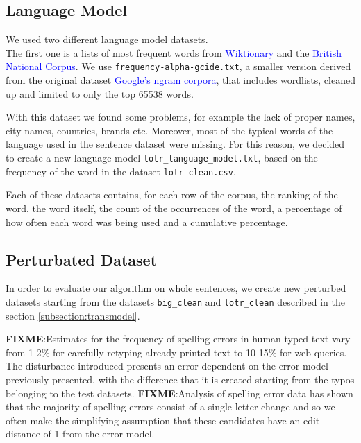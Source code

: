 \subsection{Language Model}
We used two different language model datasets. \\
The first one is a lists of most frequent words from \href{https://en.wiktionary.org/wiki/Wiktionary:Frequency_lists}{ 
\textcolor{blue}{Wiktionary}} and the \href{http://www.kilgarriff.co.uk/bnc-readme.html}{\textcolor{blue}{British National 
Corpus}}. 
We use \texttt{frequency-alpha-gcide.txt}, a smaller version derived from the original dataset 
\href{https://books.google.com/ngrams/}{\textcolor{blue}{Google's ngram corpora}}, that includes wordlists, cleaned up 
and limited to only the top \num{65538} words.

With this dataset we found some problems, for example the lack of proper names, city names, countries, brands etc.
Moreover, most of the typical words of the language used in the sentence dataset were missing.
For this reason, we decided to create a new language model \texttt{lotr\_language\_model.txt}, based on the frequency of 
the word in the dataset \texttt{lotr\_clean.csv}.

Each of these datasets contains, for each row of the corpus, the ranking of the word, the word itself, the count of the 
occurrences of the word, a percentage of how often each word was being used and a cumulative percentage.

\subsection{Perturbated Dataset}
\label{subsection:perturbed}
In order to evaluate our algorithm on whole sentences, we create new perturbed datasets starting from the datasets 
\texttt{big\_clean} and \texttt{lotr\_clean} described in the section \ref{subsection:transmodel}.

\textbf{FIXME}:Estimates for the frequency of spelling errors in human-typed text vary from 1-2\% for carefully retyping 
already printed text to 10-15\% for web queries.
The disturbance introduced presents an error dependent on the error model previously presented, with the 
difference that it is created starting from the typos belonging to the test datasets.
\textbf{FIXME}:{Analysis of spelling error data has shown that the majority of spelling errors consist of a single-letter 
change and 
	so we often make the simplifying assumption that these candidates have an edit distance of 1 from the error 
	model.}

